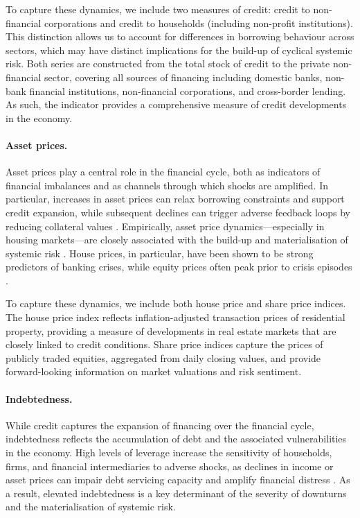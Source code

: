 To capture these dynamics, we include two measures of credit: credit to non-financial corporations and credit to households (including non-profit institutions). This distinction allows us to account for differences in borrowing behaviour across sectors, which may have distinct implications for the build-up of cyclical systemic risk. Both series are constructed from the total stock of credit to the private non-financial sector, covering all sources of financing including domestic banks, non-bank financial institutions, non-financial corporations, and cross-border lending. As such, the indicator provides a comprehensive measure of credit developments in the economy.

\paragraph{Asset prices.}  

Asset prices play a central role in the financial cycle, both as indicators of financial imbalances and as channels through which shocks are amplified. In particular, increases in asset prices can relax borrowing constraints and support credit expansion, while subsequent declines can trigger adverse feedback loops by reducing collateral values \citep{kiyotaki1997credit}. Empirically, asset price dynamics—especially in housing markets—are closely associated with the build-up and materialisation of systemic risk \citep{jorda2015leveraged, claessens2012business}. House prices, in particular, have been shown to be strong predictors of banking crises, while equity prices often peak prior to crisis episodes \citep{mian2014explains, reinhart2013banking}.

To capture these dynamics, we include both house price and share price indices. The house price index reflects inflation-adjusted transaction prices of residential property, providing a measure of developments in real estate markets that are closely linked to credit conditions. Share price indices capture the prices of publicly traded equities, aggregated from daily closing values, and provide forward-looking information on market valuations and risk sentiment.

\paragraph{Indebtedness.} 

While credit captures the expansion of financing over the financial cycle, indebtedness reflects the accumulation of debt and the associated vulnerabilities in the economy. High levels of leverage increase the sensitivity of households, firms, and financial intermediaries to adverse shocks, as declines in income or asset prices can impair debt servicing capacity and amplify financial distress \citep{adrian2010liquidity, brunnermeier2009market}. As a result, elevated indebtedness is a key determinant of the severity of downturns and the materialisation of systemic risk.

